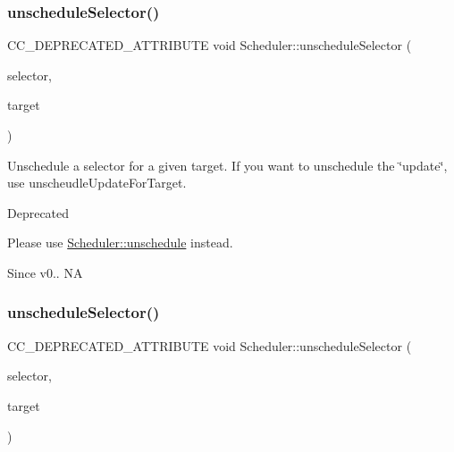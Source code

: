 \subsubsection{\texorpdfstring{unschedule\+Selector()}{unscheduleSelector()}\hspace{0.1cm}{\footnotesize\ttfamily [1/2]}}
{\footnotesize\ttfamily C\+C\+\_\+\+D\+E\+P\+R\+E\+C\+A\+T\+E\+D\+\_\+\+A\+T\+T\+R\+I\+B\+U\+TE void Scheduler\+::unschedule\+Selector (\begin{DoxyParamCaption}\item[{S\+E\+L\+\_\+\+S\+C\+H\+E\+D\+U\+LE}]{selector,  }\item[{\hyperlink{classRef}{Ref} $\ast$}]{target }\end{DoxyParamCaption})\hspace{0.3cm}{\ttfamily [inline]}}

Unschedule a selector for a given target. If you want to unschedule the \char`\"{}update\char`\"{}, use unscheudle\+Update\+For\+Target. \begin{DoxyRefDesc}{Deprecated}
\item[\hyperlink{deprecated__deprecated000057}{Deprecated}]Please use \textquotesingle{}\hyperlink{classScheduler_a3ca194b9ca146d9c522cc2c54a6d4ede}{Scheduler\+::unschedule}\textquotesingle{} instead. \end{DoxyRefDesc}
\begin{DoxySince}{Since}
v0..  NA 
\end{DoxySince}
\mbox{\label{classScheduler_a25e540092eabffd80c97fe2af4faf7d5}} 
\subsubsection{\texorpdfstring{unschedule\+Selector()}{unscheduleSelector()}\hspace{0.1cm}{\footnotesize\ttfamily [2/2]}}
{\footnotesize\ttfamily C\+C\+\_\+\+D\+E\+P\+R\+E\+C\+A\+T\+E\+D\+\_\+\+A\+T\+T\+R\+I\+B\+U\+TE void Scheduler\+::unschedule\+Selector (\begin{DoxyParamCaption}\item[{S\+E\+L\+\_\+\+S\+C\+H\+E\+D\+U\+LE}]{selector,  }\item[{\hyperlink{classRef}{Ref} $\ast$}]{target }\end{DoxyParamCaption})\hspace{0.3cm}{\ttfamily [inline]}}

